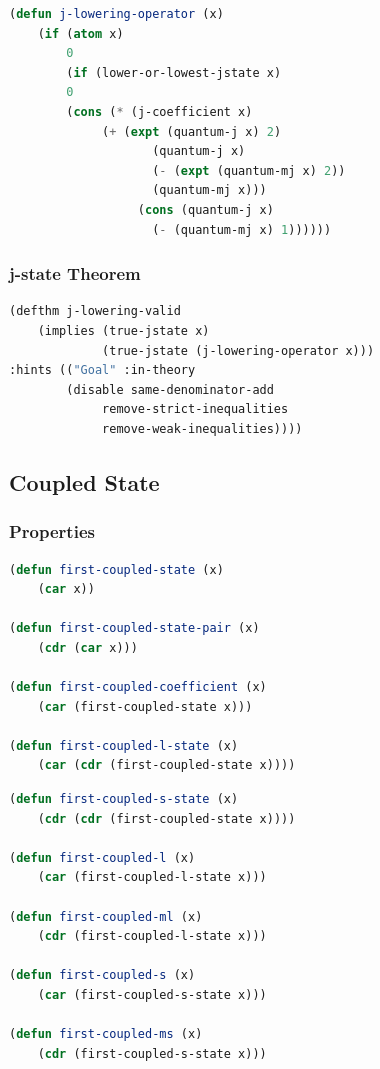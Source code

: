 \documentclass[
paper=128mm:96mm, %
fontsize=11pt, %
pagesize, %
parskip=half-, %
]{scrartcl} %
\theoremstyle{mythmstyle} %
\begin{document}
\begin{lstlisting}[language=Lisp,breaklines=true]
(defun j-lowering-operator (x) 
	(if (atom x)
	    0
	    (if (lower-or-lowest-jstate x)
		0
	  	(cons (* (j-coefficient x)
			 (+ (expt (quantum-j x) 2) 
		    	    (quantum-j x)
		            (- (expt (quantum-mj x) 2))
		            (quantum-mj x)))
	              (cons (quantum-j x)
		            (- (quantum-mj x) 1))))))
\end{lstlisting}


\clearpage

\subsubsection{j-state Theorem}

\begin{lstlisting}[language=Lisp,breaklines=true]
(defthm j-lowering-valid 
	(implies (true-jstate x)
	         (true-jstate (j-lowering-operator x)))
:hints (("Goal" :in-theory 
		(disable same-denominator-add 
			 remove-strict-inequalities 
			 remove-weak-inequalities))))
\end{lstlisting}

\clearpage

\subsection{Coupled State}

\subsubsection{Properties}

\begin{lstlisting}[language=Lisp,breaklines=true]
(defun first-coupled-state (x)
	(car x))

(defun first-coupled-state-pair (x)
	(cdr (car x)))

(defun first-coupled-coefficient (x)
	(car (first-coupled-state x)))

(defun first-coupled-l-state (x)
	(car (cdr (first-coupled-state x))))
\end{lstlisting}

\begin{lstlisting}[language=Lisp,breaklines=true]
(defun first-coupled-s-state (x)
	(cdr (cdr (first-coupled-state x))))

(defun first-coupled-l (x)
	(car (first-coupled-l-state x)))

(defun first-coupled-ml (x)
	(cdr (first-coupled-l-state x)))

(defun first-coupled-s (x)
	(car (first-coupled-s-state x)))

(defun first-coupled-ms (x)
	(cdr (first-coupled-s-state x)))

\end{lstlisting}
\end{document}
